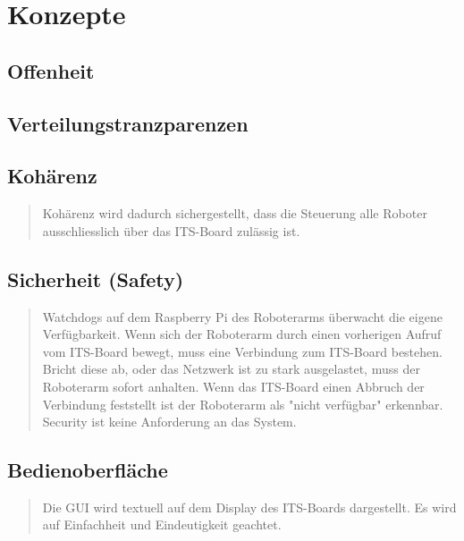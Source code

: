\chapter{Konzepte}
\begin{quote}
	
\end{quote}

\section{Offenheit}
\begin{quote}
	
\end{quote}
	
\section{Verteilungstranzparenzen}
\begin{quote}
	
\end{quote}

\section{Kohärenz}
\begin{quote}
Kohärenz wird dadurch sichergestellt, dass die Steuerung alle Roboter ausschliesslich über das ITS-Board zulässig ist.
\end{quote}
\section{Sicherheit (Safety)}
\begin{quote}
Watchdogs auf dem Raspberry Pi des Roboterarms überwacht die eigene Verfügbarkeit. Wenn sich der Roboterarm durch einen vorherigen Aufruf vom ITS-Board bewegt, muss eine Verbindung zum ITS-Board bestehen. Bricht diese ab, oder das Netzwerk ist zu stark ausgelastet, muss der Roboterarm sofort anhalten. Wenn das ITS-Board einen Abbruch der Verbindung feststellt ist der Roboterarm als "nicht verfügbar" erkennbar.
Security ist keine Anforderung an das System.
\end{quote}
\section{Bedienoberfläche}
\begin{quote}
	Die GUI wird textuell auf dem Display des ITS-Boards dargestellt. Es wird auf Einfachheit und Eindeutigkeit geachtet.
	
\end{quote}

